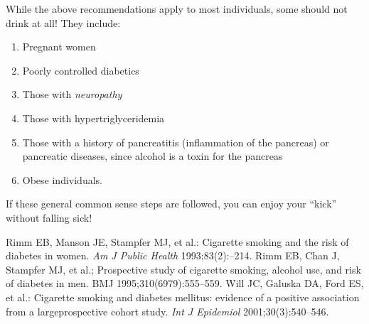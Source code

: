While the above recommendations apply to most individuals, some should not drink at all! They include:

\begin{enumerate}[•]
\itemsep=0pt
\item Pregnant women
\item Poorly controlled diabetics
\item Those with \textit{neuropathy}
\item Those with hypertriglyceridemia
\item Those with a history of pancreatitis (inflammation of the pancreas) or pancreatic diseases, since alcohol is a toxin for the pancreas
\item Obese individuals.
\end{enumerate}

If these general common sense steps are followed, you can enjoy your “kick” without falling sick!

\begin{thebibliography}{99}
 Rimm EB, Manson JE, Stampfer MJ, et al.: Cigarette smoking and the risk of diabetes in women. \textit{Am J Public Health} 1993;83(2):–214.
 Rimm EB, Chan J, Stampfer MJ, et al.; Prospective study of cigarette smoking, alcohol use, and risk of diabetes in men. BMJ 1995;310(6979):555–559.
 Will JC, Galuska DA, Ford ES, et al.: Cigarette smoking and dia\-betes mellitus: evidence of a positive association from a large\break prospective cohort study. \textit{Int J Epidemiol} 2001;30(3):540–546.
\end{thebibliography}

